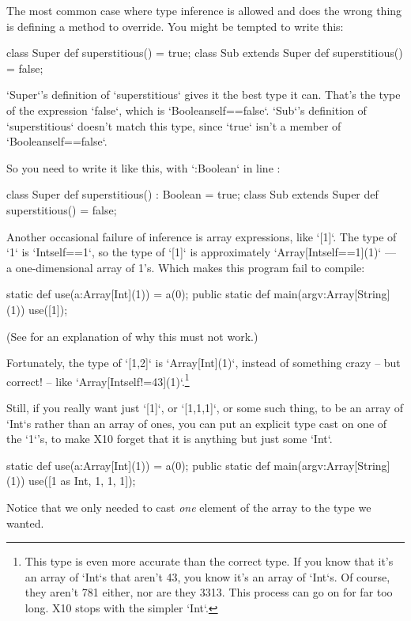 The most common case where type inference is allowed and does the wrong thing
is defining a method to override.  You might be tempted to write this: 
\begin{xten}
class Super {
  def superstitious() = true;
}
class Sub extends Super {
  def superstitious() = false;
}
\end{xten}
\xcd`Super`'s definition of \xcd`superstitious` gives it the best type it can.
That's the type of the expression \xcd`false`, which is
\xcd`Boolean{self==false}`.  \xcd`Sub`'s definition of \xcd`superstitious`
doesn't match this type, since \xcd`true` isn't a member of 
\xcd`Boolean{self==false}`.

So you need to write it like this, with \xcd`:Boolean` in line
: 
\begin{xtennum}[]
 class Super {
  def superstitious() : Boolean = true;
}
 class Sub extends Super {
  def superstitious() = false;
}
\end{xtennum}

Another occasional failure of inference is array expressions, like 
\xcd`[1]`.  The type of \xcd`1` is \xcd`Int{self==1}`, 
so the type of \xcd`[1]` is approximately 
\xcd`Array[Int{self==1}](1)` --- a one-dimensional array of 1's.  
Which makes this program fail to compile: 
\begin{xten}
static def use(a:Array[Int](1)) = a(0);
public static def main(argv:Array[String](1)) {
  use([1]);
}
\end{xten}
(See  for an explanation of why 
this must not work.)

Fortunately, the type of \xcd`[1,2]` is \xcd`Array[Int](1)`, instead of
something crazy -- but correct! -- like
\xcd`Array[Int{self!=43}](1)`.\footnote{This type is even more accurate than
the correct type.  If you know that it's an array of \xcd`Int`s that aren't
43, you know it's an array of \xcd`Int`s.  Of course, they aren't 781 either,
nor are they 3313. This process can go on for far too long.  X10 stops with
the simpler \xcd`Int`.}

Still, if you really want just \xcd`[1]`, or \xcd`[1,1,1]`, or some such
thing, to be an array of \xcd`Int`s rather than an array of ones, you can
put an explicit type cast on one of the \xcd`1`'s, to make X10 forget that it
is anything but just some \xcd`Int`.  
\begin{xtennum}[]
static def use(a:Array[Int](1)) = a(0);
public static def main(argv:Array[String](1)) {
  use([1 as Int, 1, 1, 1]);
}
\end{xtennum}
Notice that we only needed to cast {\em one} element of the array to the type
we wanted.  


